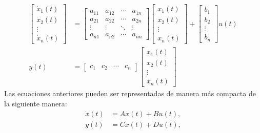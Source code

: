     \begin{align}
    \begin{bmatrix}
    \dot{x}_1(t) \\
    \dot{x}_2(t) \\
    \vdots \\
    \dot{x}_n(t)
    \end{bmatrix}
    &=
    \begin{bmatrix}
    a_{11} & a_{12} & \cdots & a_{1n} \\
    a_{21} & a_{22} & \cdots & a_{2n} \\
    \vdots & \vdots & \ddots & \vdots \\
    a_{n1} & a_{n2} & \cdots & a_{nn}
    \end{bmatrix}
    \begin{bmatrix}
    x_1(t) \\
    x_2(t) \\
    \vdots \\
    x_n(t)
    \end{bmatrix}
    +
    \begin{bmatrix}
    b_1 \\
    b_2 \\
    \vdots \\
    b_n
    \end{bmatrix}
    u(t)
    \label{eq:2.4}
    \\
    y(t) &=
    \begin{bmatrix}
    c_1 & c_2 & \cdots & c_n
    \end{bmatrix}
    \begin{bmatrix}
    x_1(t) \\
    x_2(t) \\
    \vdots \\
    x_n(t)
    \end{bmatrix}
    \label{eq:2.5}
    \end{align}
    Las ecuaciones anteriores pueden ser representadas de manera más compacta de la siguiente manera:\\
    \begin{align}
    	\dot{x}(t) &= A x(t) + B u(t), \label{eq:2.8}\\ 
    	y(t) &= C x(t) + D u(t), \label{eq:2.9}
   \end{align}
    
